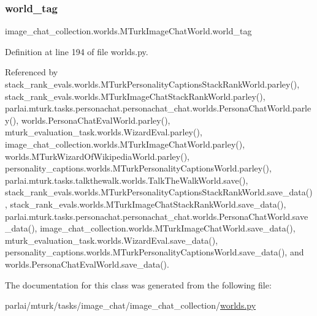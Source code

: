 \subsubsection{\texorpdfstring{world\+\_\+tag}{world\_tag}}
{\footnotesize\ttfamily image\+\_\+chat\+\_\+collection.\+worlds.\+M\+Turk\+Image\+Chat\+World.\+world\+\_\+tag}



Definition at line 194 of file worlds.\+py.



Referenced by stack\+\_\+rank\+\_\+evals.\+worlds.\+M\+Turk\+Personality\+Captions\+Stack\+Rank\+World.\+parley(), stack\+\_\+rank\+\_\+evals.\+worlds.\+M\+Turk\+Image\+Chat\+Stack\+Rank\+World.\+parley(), parlai.\+mturk.\+tasks.\+personachat.\+personachat\+\_\+chat.\+worlds.\+Persona\+Chat\+World.\+parley(), worlds.\+Persona\+Chat\+Eval\+World.\+parley(), mturk\+\_\+evaluation\+\_\+task.\+worlds.\+Wizard\+Eval.\+parley(), image\+\_\+chat\+\_\+collection.\+worlds.\+M\+Turk\+Image\+Chat\+World.\+parley(), worlds.\+M\+Turk\+Wizard\+Of\+Wikipedia\+World.\+parley(), personality\+\_\+captions.\+worlds.\+M\+Turk\+Personality\+Captions\+World.\+parley(), parlai.\+mturk.\+tasks.\+talkthewalk.\+worlds.\+Talk\+The\+Walk\+World.\+save(), stack\+\_\+rank\+\_\+evals.\+worlds.\+M\+Turk\+Personality\+Captions\+Stack\+Rank\+World.\+save\+\_\+data(), stack\+\_\+rank\+\_\+evals.\+worlds.\+M\+Turk\+Image\+Chat\+Stack\+Rank\+World.\+save\+\_\+data(), parlai.\+mturk.\+tasks.\+personachat.\+personachat\+\_\+chat.\+worlds.\+Persona\+Chat\+World.\+save\+\_\+data(), image\+\_\+chat\+\_\+collection.\+worlds.\+M\+Turk\+Image\+Chat\+World.\+save\+\_\+data(), mturk\+\_\+evaluation\+\_\+task.\+worlds.\+Wizard\+Eval.\+save\+\_\+data(), personality\+\_\+captions.\+worlds.\+M\+Turk\+Personality\+Captions\+World.\+save\+\_\+data(), and worlds.\+Persona\+Chat\+Eval\+World.\+save\+\_\+data().



The documentation for this class was generated from the following file\+:\begin{DoxyCompactItemize}
\item 
parlai/mturk/tasks/image\+\_\+chat/image\+\_\+chat\+\_\+collection/\hyperlink{parlai_2mturk_2tasks_2image__chat_2image__chat__collection_2worlds_8py}{worlds.\+py}\end{DoxyCompactItemize}
